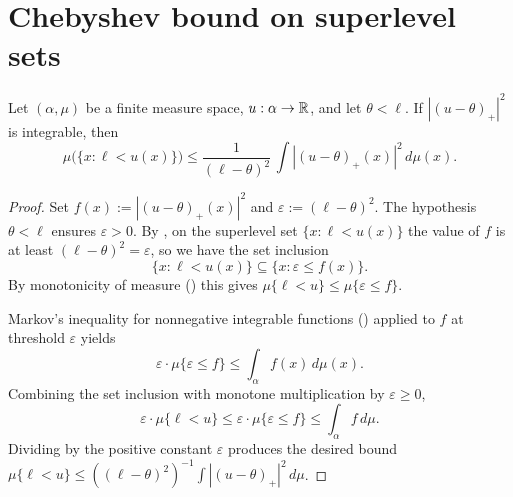 \section{Chebyshev bound on superlevel sets}

\begin{theorem}
\label{thm:superlevel_measureReal_le_integral_posPart}
\leanok
{}
Let $(\alpha, \mu)$ be a finite measure space, $u : \alpha \to \mathbb{R}$,
and let $\theta < \ell$. If $|(u-\theta)_+|^2$ is integrable, then
\begin{equation*}
  \mu\bigl(\{x : \ell < u(x)\}\bigr)
   \le \frac{1}{(\ell-\theta)^2}\,
       \int |(u-\theta)_+(x)|^2 \, d\mu(x).
\end{equation*}
\end{theorem}

\begin{proof}
\leanok
{}

Set $f(x) := |(u-\theta)_+(x)|^2$ and $\varepsilon := (\ell-\theta)^2$. The
hypothesis $\theta < \ell$ ensures $\varepsilon > 0$. By
, on the superlevel set
$\{x : \ell < u(x)\}$ the value of $f$ is at least
$(\ell - \theta)^2 = \varepsilon$, so we have the set inclusion
\begin{equation*}
  \{x : \ell < u(x)\}
    \subseteq \{x : \varepsilon \le f(x)\}.
\end{equation*}
By monotonicity of measure () this gives
$\mu\{\ell < u\} \le \mu\{\varepsilon \le f\}$.

Markov's inequality for nonnegative integrable functions
() applied to
$f$ at threshold $\varepsilon$ yields
\begin{equation*}
  \varepsilon \cdot \mu\{\varepsilon \le f\}
   \le \int_{\alpha} f(x)\,d\mu(x).
\end{equation*}
Combining the set inclusion with monotone multiplication by $\varepsilon \ge 0$,
\begin{equation*}
  \varepsilon \cdot \mu\{\ell < u\}
   \le \varepsilon \cdot \mu\{\varepsilon \le f\}
   \le \int_{\alpha} f\,d\mu.
\end{equation*}
Dividing by the positive constant $\varepsilon$ produces the desired bound
$\mu\{\ell < u\} \le ((\ell - \theta)^2)^{-1}\int |(u-\theta)_+|^2\,d\mu$.
\end{proof}

